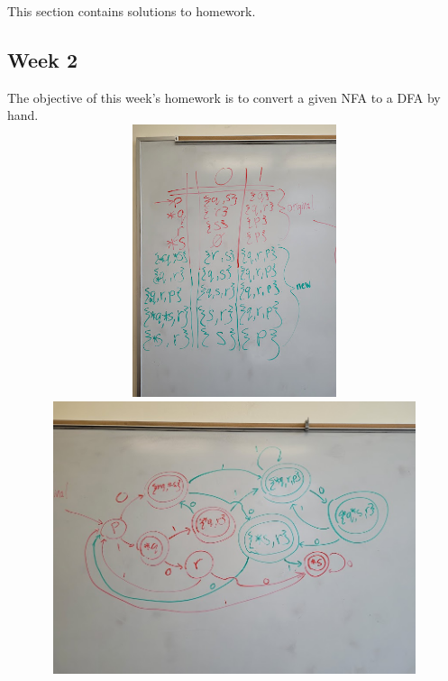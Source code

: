 \documentclass{article}
\theoremstyle{theorem}
\theoremstyle{definition}
\theoremstyle{remark}
\begin{document}
This section contains solutions to homework. 

\subsection{Week 2}
The objective of this week's homework is to convert a given NFA to a DFA by hand.
\\ \includegraphics[width=15cm, height=8cm]{Report Images/HW2_1.jpg}
\\ \includegraphics[width=15cm, height=8cm]{Report Images/HW2_2.jpg}
\end{document}
